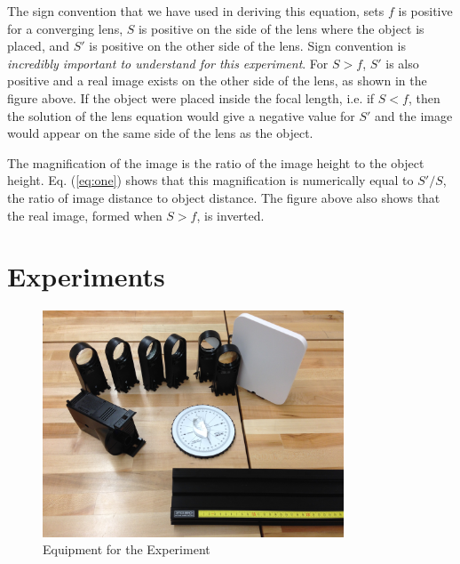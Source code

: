 The sign convention that we have used in deriving this equation, sets $f$ is positive for a converging lens, $S$ is positive on the side of the lens where the object is placed, and $S'$ is positive on the other side of the lens. Sign convention is \emph{incredibly important to understand for this experiment}. For $S>f$, $S'$ is also positive and a real image exists on the other side of the lens, as shown in the figure above. If the object were placed inside the focal length, i.e. if $S<f$, then the solution of the lens equation would give a negative value for $S'$ and the image would appear on the same side of the lens as the object.\myskip

The magnification of the image is the ratio of the image height to the object height. Eq. ({\ref{eq:one}}) shows that this magnification is numerically equal to $S'/S$, the ratio of image distance to object distance. The figure above also shows that the real image, formed when $S>f$, is inverted.

\section{Experiments}

\begin{figure}[h]
    \begin{center}
        \includegraphics[width=0.8\textwidth]{./Exp6/pic/equipment.jpg}
    \end{center}
    \caption{Equipment for the Experiment}
    \label{fig:equip4}
\end{figure}

